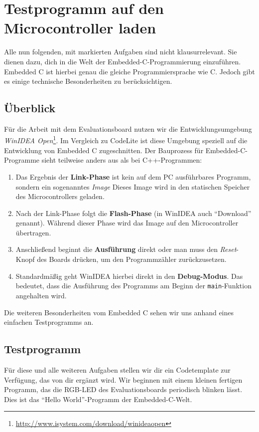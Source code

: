 \section{\ExercisePrefixEmbeddedC Testprogramm auf den Microcontroller laden \optional}

Alle nun folgenden, mit \ExercisePrefixEmbeddedC markierten Aufgaben sind nicht klausurrelevant.
Sie dienen dazu, dich in die Welt der Embedded-C-Programmierung einzuführen.
Embedded C ist hierbei genau die gleiche Programmiersprache wie C.
Jedoch gibt es einige technische Besonderheiten zu berücksichtigen.

\subsection{Überblick}
Für die Arbeit mit dem Evaluationsboard nutzen wir die Entwicklungsumgebung \emph{WinIDEA Open}\footnote{\url{http://www.isystem.com/download/winideaopen}}.
%
Im Vergleich zu CodeLite ist diese Umgebung speziell auf die Entwicklung von Embedded C zugeschnitten.
Der Bauprozess für Embedded-C-Programme sieht teilweise anders aus als bei C++-Programmen:
\begin{enumerate}
\item 
Das Ergebnis der \textbf{Link-Phase} ist kein auf dem PC ausführbares Programm, sondern ein sogenanntes \emph{Image}
Dieses Image wird in den statischen Speicher des Microcontrollers geladen.
\item
Nach der Link-Phase folgt die \textbf{Flash-Phase} (in WinIDEA auch \enquote{Download} genannt).
Während dieser Phase wird das Image auf den Microcontroller übertragen.
\item 
Anschließend beginnt die \textbf{Ausführung} direkt oder man muss den \emph{Reset}-Knopf des Boards drücken, um den Programmzähler zurückzusetzen.
\item
Standardmäßig geht WinIDEA hierbei direkt in den \textbf{Debug-Modus}.
Das bedeutet, dass die Ausführung des Programms am Beginn der \lstinline|main|-Funktion angehalten wird.
\end{enumerate}

Die weiteren Besonderheiten vom Embedded C sehen wir uns anhand eines einfachen Testprogramms an.

\subsection{Testprogramm}
Für diese und alle weiteren Aufgaben stellen wir dir ein Codetemplate zur Verfügung, das von dir ergänzt wird.
Wir beginnen mit einem kleinen fertigen Programm, das die RGB-LED des Evaluationsboards periodisch blinken lässt.
Dies ist das \enquote{Hello World}-Programm der Embedded-C-Welt.

